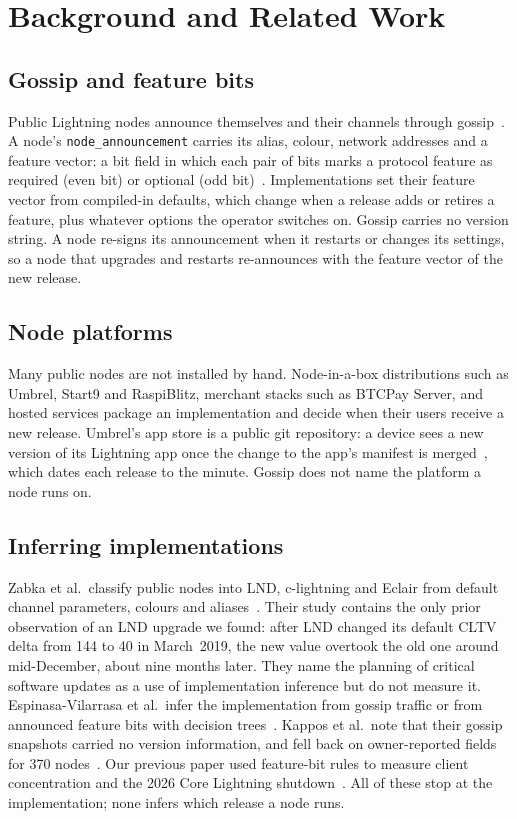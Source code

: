 \section{Background and Related Work}
\label{sec:background}

\subsection{Gossip and feature bits}
Public Lightning nodes announce themselves and their channels through gossip~\cite{bolt7}. A node's
\texttt{node\_announcement} carries its alias, colour, network addresses and a feature vector: a bit field in which
each pair of bits marks a protocol feature as required (even bit) or optional (odd bit)~\cite{bolt9}. Implementations
set their feature vector from compiled-in defaults, which change when a release adds or retires a feature, plus
whatever options the operator switches on. Gossip carries no version string. A node re-signs its announcement when
it restarts or changes its settings, so a node that upgrades and restarts re-announces with the feature vector of
the new release.

\subsection{Node platforms}
Many public nodes are not installed by hand. Node-in-a-box distributions such as Umbrel, Start9 and RaspiBlitz,
merchant stacks such as BTCPay Server, and hosted services package an implementation and decide when their users
receive a new release. Umbrel's app store is a public git repository: a device sees a new version of its Lightning
app once the change to the app's manifest is merged~\cite{umbrel2026apps}, which dates each release to the minute.
Gossip does not name the platform a node runs on.

\subsection{Inferring implementations}
Zabka et al.\ classify public nodes into LND, c-lightning and Eclair from default channel parameters, colours and
aliases~\cite{zabka2021nodeclassification,zabka2022empirical}. Their study contains the only prior observation of an
LND upgrade we found: after LND changed its default CLTV delta from 144 to 40 in March~2019, the new value overtook
the old one around mid-December, about nine months later. They name the planning of critical software updates as a
use of implementation inference but do not measure it. Espinasa-Vilarrasa et al.\ infer the implementation from
gossip traffic or from announced feature bits with decision trees~\cite{espinasa2024decisiontree}. Kappos et al.\
note that their gossip snapshots carried no version information, and fell back on owner-reported fields for 370
nodes~\cite{kappos2021privacy}. Our previous paper used feature-bit rules to measure client concentration and the
2026 Core Lightning shutdown~\cite{kumar2026clientdiversity}. All of these stop at the implementation; none infers
which release a node runs.


